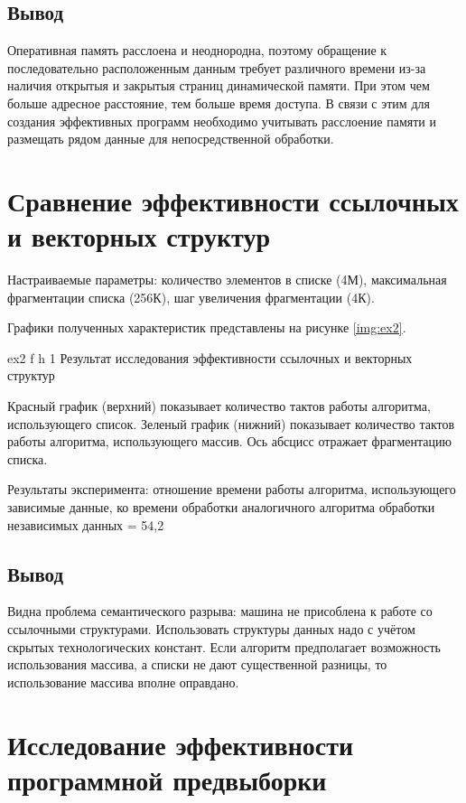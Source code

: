 \section*{Вывод}
Оперативная память расслоена и неоднородна, поэтому обращение к последовательно расположенным данным требует различного времени из-за наличия открытыя и закрытыя
страниц динамической памяти.
При этом чем больше адресное расстояние, тем больше время доступа.
В связи с этим для создания эффективных программ необходимо учитывать расслоение памяти и размещать рядом данные для непосредственной обработки.


\chapter{Сравнение эффективности ссылочных и векторных структур}

Настраиваемые параметры: количество элементов в списке (4М), максимальная фрагментации списка (256К), шаг увеличения фрагментации (4К).

Графики полученных характеристик представлены на рисунке \ref{img:ex2}.

{ex2}
{f}
{h}
{1\textwidth}
{Результат исследования эффективности ссылочных и векторных структур}

Красный график (верхний) показывает количество тактов работы алгоритма, использующего список.
Зеленый график (нижний) показывает количество тактов работы алгоритма, использующего массив.
Ось абсцисс отражает фрагментацию списка.


Результаты эксперимента: отношение времени работы алгоритма, использующего
зависимые данные, ко времени обработки аналогичного алгоритма обработки независимых
данных = 54,2


\section*{Вывод}
Видна проблема семантического разрыва: машина не присоблена к работе со ссылочными структурами.
Использовать структуры данных надо с учётом скрытых технологических констант.
Если алгоритм предполагает возможность использования массива, а списки не дают существенной разницы, то использование массива вполне оправдано.


\chapter{Исследование эффективности программной предвыборки}

